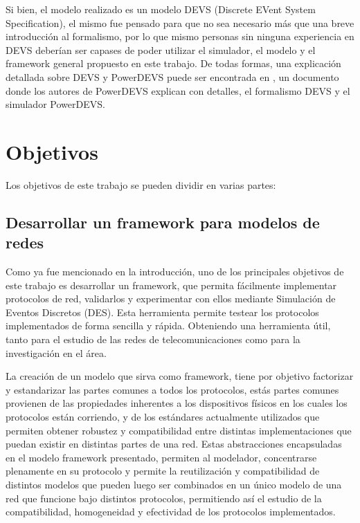 \documentclass[10pt,a4paper]{article}
\begin{document}
Si bien, el modelo realizado es un modelo DEVS (Discrete EVent System Specification), el mismo fue pensado para que no sea necesario más que una breve introducción al formalismo, por lo que mismo personas sin ninguna experiencia en DEVS deberían ser capases de poder utilizar el simulador, el modelo y el framework general propuesto en este trabajo. De todas formas, una explicación detallada sobre DEVS y PowerDEVS puede ser encontrada en \cite{bergero2011powerdevs}, un documento donde los autores de PowerDEVS explican con detalles, el formalismo DEVS y el simulador PowerDEVS. \\

\section{Objetivos}

Los objetivos de este trabajo se pueden dividir en varias partes:
\subsection{Desarrollar un framework para modelos de redes}

Como ya fue mencionado en la introducción, uno de los principales objetivos de este trabajo es desarrollar un framework, que permita fácilmente implementar protocolos de red, validarlos y experimentar con ellos mediante Simulación de Eventos Discretos (DES). Esta herramienta permite testear los protocolos implementados de forma sencilla y rápida. Obteniendo una herramienta útil, tanto para el estudio de las redes de telecomunicaciones como para la investigación en el área. 

La creación de un modelo que sirva como framework, tiene por objetivo factorizar y estandarizar las partes comunes a todos los protocolos, estás partes comunes provienen de las propiedades inherentes a los dispositivos físicos en los cuales los protocolos están corriendo, y de los estándares actualmente utilizados que permiten obtener robustez y compatibilidad entre distintas implementaciones que puedan existir en distintas partes de una red. Estas abstracciones encapsuladas en el modelo framework presentado, permiten al modelador, concentrarse plenamente en su protocolo y permite la reutilización y compatibilidad de distintos modelos que pueden luego ser combinados en un único modelo de una red que funcione bajo distintos protocolos, permitiendo así el estudio de la compatibilidad, homogeneidad y efectividad de los protocolos implementados.
\end{document}
